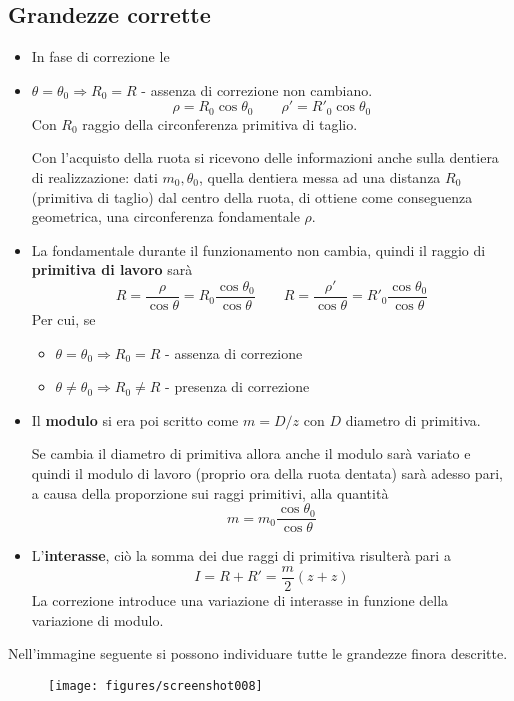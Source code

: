 \documentclass[a4paper, 15pt]{article}
\begin{document}
				\subsection{Grandezze corrette}
				\begin{adjustwidth}{2in}{}	
				\begin{itemize}
				\item In fase di correzione le 					\item $\theta = \theta_0 \Rightarrow R_0 = R$ - assenza di correzione   non cambiano.
				\[\rho = R_0\cos\theta_0 \qquad \rho' = R'_0\cos\theta_0\]
				Con $R_0$ raggio della circonferenza primitiva di taglio. 
				
				Con l'acquisto della ruota si ricevono delle informazioni anche sulla dentiera di realizzazione: dati $m_0, \theta_0$, quella dentiera messa ad una distanza $R_0$ (primitiva di taglio) dal centro della ruota, di ottiene come conseguenza geometrica, una circonferenza fondamentale $\rho$. \newline 
				
				\item La fondamentale durante il funzionamento non cambia, quindi il raggio di \textbf{primitiva di lavoro} sarà 
				\[R = \dfrac{\rho}{\cos\theta} = R_0\dfrac{\cos\theta_0}{\cos\theta} \qquad R = \dfrac{\rho'}{\cos\theta} = R'_0\dfrac{\cos\theta_0}{\cos\theta}\]
				Per cui, se
				\begin{itemize}
					\item $\theta = \theta_0 \Rightarrow R_0 = R$ - assenza di correzione  																												         \item $\theta \ne \theta_0 \Rightarrow R_0 \ne R$ - presenza di correzione  
				\end{itemize}
				
				\item Il \textbf{modulo} si era poi scritto come $m = D/z $ con $D$ diametro di primitiva. 
				
				Se cambia il diametro di primitiva allora anche il modulo sarà variato e quindi il modulo di lavoro (proprio ora della ruota dentata) sarà adesso pari, a causa della proporzione sui raggi primitivi, alla quantità 
				\[m = m_0\dfrac{\cos\theta_0}{\cos\theta}\] 
				
				\item L'\textbf{interasse}, ciò la somma dei due raggi di primitiva risulterà pari a 
				\[I = R+R'=\dfrac{m}{2}(z+z)\]
				La correzione introduce una variazione di interasse in funzione della variazione di modulo.
				\end{itemize}
				Nell'immagine seguente si possono individuare tutte le grandezze finora descritte.
				\begin{figure}[H]
					\centering
					\texttt{[image: figures/screenshot008]}
					\label{fig:screenshot008}
				\end{figure}
				

\end{adjustwidth}
\end{document}
